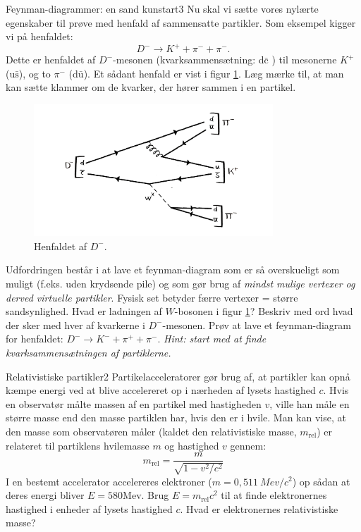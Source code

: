 \begin{opgave}{Feynman-diagrammer: en sand kunstart}{3}
Nu skal vi sætte vores nylærte
egenskaber til prøve med henfald af sammensatte partikler. Som
eksempel kigger vi på henfaldet:
\begin{equation*}
D^- \rightarrow K^+ + \pi^- + \pi^-.
\end{equation*}
Dette er henfaldet af $D^-$-mesonen (kvarksammensætning: d$\bar{\text{c}}$ ) til mesonerne $K^+$ (u$\bar{\text{s}}$), og to $\pi^-$ (d$\bar{\text{u}}$). Et sådant henfald er vist i figur \ref{fig:D_reaction}. Læg mærke til, at man kan sætte klammer om de kvarker, der hører sammen i en partikel.
\begin{figure}[h!]
  \centering
  \includegraphics[width=0.8\textwidth]{KernePartikel/reaction3.png}
  \caption{Henfaldet af $D^-$.}
  \label{fig:D_reaction}
\end{figure}
Udfordringen består i at lave et feynman-diagram som er så overskueligt som muligt (f.eks. uden krydsende pile) og som gør brug af \emph{mindst mulige vertexer og derved virtuelle partikler}. Fysisk set betyder færre vertexer = større sandsynlighed.
\opg Hvad er ladningen af $W$-bosonen i figur \ref{fig:D_reaction}?
\opg Beskriv med ord hvad der sker med hver af kvarkerne i $D^-$-mesonen.
\opg Prøv at lave et feynman-diagram for henfaldet: $D^- \rightarrow K^- + \pi^+ + \pi^-$. \emph{Hint: start med at finde kvarksammensætningen af partiklerne.}
\end{opgave}

\begin{opgave}{Relativistiske partikler}{2}
Partikelacceleratorer gør brug af, at partikler kan opnå kæmpe energi ved at blive accelereret op i nærheden af lysets hastighed $c$. Hvis en observatør målte massen af en partikel med hastigheden $v$, ville han måle en større masse end den masse partiklen har, hvis den er i hvile. Man kan vise, at den masse som observatøren måler (kaldet den relativistiske masse, $m_\text{rel}$) er relateret til partiklens hvilemasse $m$ og hastighed $v$ gennem:
\begin{equation}
m_\text{rel} = \frac{m}{\sqrt{1-v^2/c^2}}
\end{equation}
\opg I en bestemt accelerator accelereres elektroner ($m=0,511\SI{}{Mev/c^2}$) op sådan at deres energi bliver $E=580$Mev. Brug $E=m_\text{rel}c^2$ til at finde elektronernes hastighed i enheder af lysets hastighed $c$.
\opg Hvad er elektronernes relativistiske masse?
\end{opgave}

